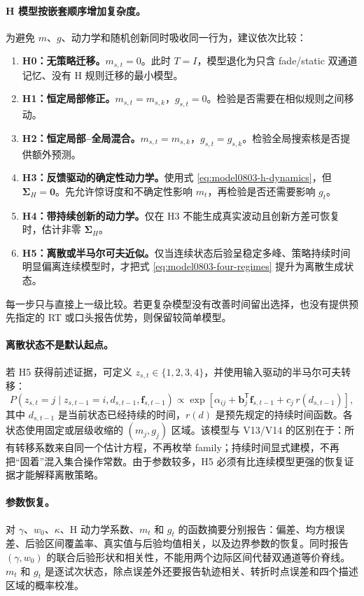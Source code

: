 \paragraph{H 模型按嵌套顺序增加复杂度。}
为避免 $m$、$g$、动力学和随机创新同时吸收同一行为，建议依次比较：
\begin{enumerate}
    \item \textbf{H0：无策略迁移。}$m_{s,t}=0$。此时 $T=I$，模型退化为只含 fade/static 双通道记忆、没有 H 规则迁移的最小模型。
    \item \textbf{H1：恒定局部修正。}$m_{s,t}=m_{s,k}$，$g_{s,t}=0$。检验是否需要在相似规则之间移动。
    \item \textbf{H2：恒定局部--全局混合。}$m_{s,t}=m_{s,k}$，$g_{s,t}=g_{s,k}$。检验全局搜索核是否提供额外预测。
    \item \textbf{H3：反馈驱动的确定性动力学。}使用式 \ref{eq:model0803-h-dynamics}，但 $\boldsymbol\Sigma_H=\mathbf0$。先允许惊讶度和不确定性影响 $m_t$，再检验是否还需要影响 $g_t$。
    \item \textbf{H4：带持续创新的动力学。}仅在 H3 不能生成真实波动且创新方差可恢复时，估计非零 $\boldsymbol\Sigma_H$。
    \item \textbf{H5：离散或半马尔可夫近似。}仅当连续状态后验呈稳定多峰、策略持续时间明显偏离连续模型时，才把式 \ref{eq:model0803-four-regimes} 提升为离散生成状态。
\end{enumerate}
每一步只与直接上一级比较。若更复杂模型没有改善时间留出选择，也没有提供预先指定的 RT 或口头报告优势，则保留较简单模型。

\paragraph{离散状态不是默认起点。}
若 H5 获得前述证据，可定义 $z_{s,t}\in\{1,2,3,4\}$，并使用输入驱动的半马尔可夫转移：
\begin{equation}
    P(z_{s,t}=j\mid z_{s,t-1}=i,d_{s,t-1},\mathbf f_{s,t-1})
    \propto
    \exp\!\left[
      \alpha_{ij}
      +\mathbf b_j^{\mathsf T}\mathbf f_{s,t-1}
      +c_j\,r(d_{s,t-1})
    \right],
    \label{eq:model0803-semi-markov}
\end{equation}
其中 $d_{s,t-1}$ 是当前状态已经持续的时间，$r(d)$ 是预先规定的持续时间函数。各状态使用固定或层级收缩的 $(m_j,g_j)$ 区域。该模型与 V13/V14 的区别在于：所有转移系数来自同一个估计方程，不再枚举 family；持续时间显式建模，不再把“固着”混入集合操作常数。由于参数较多，H5 必须有比连续模型更强的恢复证据才能解释离散策略。

\paragraph{参数恢复。}
对 $\gamma$、$w_0$、$\kappa$、H 动力学系数、$m_t$ 和 $g_t$ 的函数摘要分别报告：偏差、均方根误差、后验区间覆盖率、真实值与后验均值相关，以及边界参数的恢复。同时报告 $(\gamma,w_0)$ 的联合后验形状和相关性，不能用两个边际区间代替双通道等价脊线。$m_t$ 和 $g_t$ 是逐试次状态，除点误差外还要报告轨迹相关、转折时点误差和四个描述区域的概率校准。

